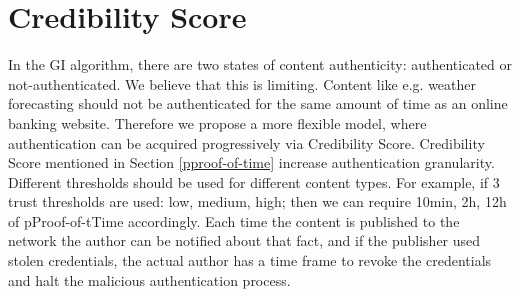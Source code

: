 \section{Credibility Score}
\label{credibility-score}
In the GI algorithm, there are two states of content authenticity: authenticated or not-authenticated. We believe that this is limiting. Content like e.g. weather forecasting should not be authenticated for the same amount of time as an online banking website. Therefore we propose a more flexible model, where authentication can be acquired progressively via Credibility Score. Credibility Score mentioned in Section \ref{pproof-of-time} increase authentication granularity. Different thresholds should be used for different content types. For example, if 3 trust thresholds are used: low, medium, high; then we can require 10min, 2h, 12h of pProof-of-tTime accordingly. Each time the content is published to the network the author can be notified about that fact, and if the publisher used stolen credentials, the actual author has a time frame to revoke the credentials and halt the malicious authentication process.



